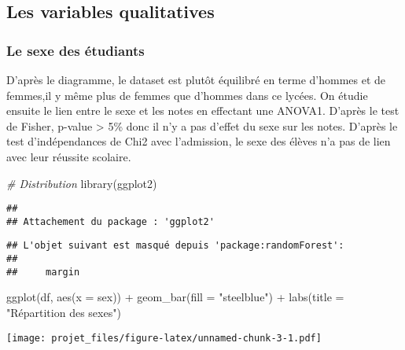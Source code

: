 \documentclass[
]{article}
\newenvironment{Shaded}{\begin{snugshade}}{\end{snugshade}}
\newcommand{\AttributeTok}[1]{\textcolor[rgb]{0.77,0.63,0.00}{#1}}
\newcommand{\CommentTok}[1]{\textcolor[rgb]{0.56,0.35,0.01}{\textit{#1}}}
\newcommand{\FunctionTok}[1]{\textcolor[rgb]{0.00,0.00,0.00}{#1}}
\newcommand{\NormalTok}[1]{#1}
\newcommand{\SpecialCharTok}[1]{\textcolor[rgb]{0.00,0.00,0.00}{#1}}
\newcommand{\StringTok}[1]{\textcolor[rgb]{0.31,0.60,0.02}{#1}}
\begin{document}
\hypertarget{les-variables-qualitatives}{%
\subsection{Les variables
qualitatives}\label{les-variables-qualitatives}}

\hypertarget{le-sexe-des-uxe9tudiants}{%
\subsubsection{Le sexe des étudiants}\label{le-sexe-des-uxe9tudiants}}

D'après le diagramme, le dataset est plutôt équilibré en terme d'hommes
et de femmes,il y même plus de femmes que d'hommes dans ce lycées. On
étudie ensuite le lien entre le sexe et les notes en effectant une
ANOVA1. D'après le test de Fisher, p-value \textgreater{} 5\% donc il
n'y a pas d'effet du sexe sur les notes. D'après le test d'indépendances
de Chi2 avec l'admission, le sexe des élèves n'a pas de lien avec leur
réussite scolaire.

\begin{Shaded}
\begin{Highlighting}[]
\CommentTok{\# Distribution}
\FunctionTok{library}\NormalTok{(ggplot2)}
\end{Highlighting}
\end{Shaded}

\begin{verbatim}
## 
## Attachement du package : 'ggplot2'
\end{verbatim}

\begin{verbatim}
## L'objet suivant est masqué depuis 'package:randomForest':
## 
##     margin
\end{verbatim}

\begin{Shaded}
\begin{Highlighting}[]
\FunctionTok{ggplot}\NormalTok{(df, }\FunctionTok{aes}\NormalTok{(}\AttributeTok{x =}\NormalTok{ sex)) }\SpecialCharTok{+} 
  \FunctionTok{geom\_bar}\NormalTok{(}\AttributeTok{fill =} \StringTok{"steelblue"}\NormalTok{) }\SpecialCharTok{+} 
  \FunctionTok{labs}\NormalTok{(}\AttributeTok{title =} \StringTok{"Répartition des sexes"}\NormalTok{)}
\end{Highlighting}
\end{Shaded}

\texttt{[image: projet\_files/figure-latex/unnamed-chunk-3-1.pdf]}
\end{document}
